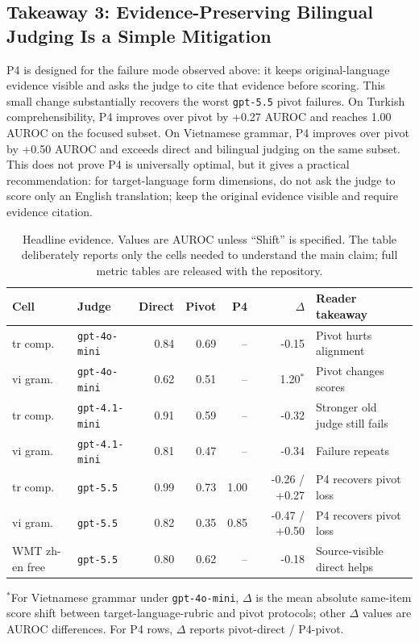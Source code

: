 \documentclass{article}
\begin{document}
\subsection{Takeaway 3: Evidence-Preserving Bilingual Judging Is a Simple Mitigation}

P4 is designed for the failure mode observed above: it keeps original-language evidence visible and asks the judge to cite that evidence before scoring. This small change substantially recovers the worst \texttt{gpt-5.5} pivot failures. On Turkish comprehensibility, P4 improves over pivot by +0.27 AUROC and reaches 1.00 AUROC on the focused subset. On Vietnamese grammar, P4 improves over pivot by +0.50 AUROC and exceeds direct and bilingual judging on the same subset. This does not prove P4 is universally optimal, but it gives a practical recommendation: for target-language form dimensions, do not ask the judge to score only an English translation; keep the original evidence visible and require evidence citation.

\begin{table}[t]
\centering
\caption{Headline evidence. Values are AUROC unless ``Shift'' is specified. The table deliberately reports only the cells needed to understand the main claim; full metric tables are released with the repository.}
\label{tab:headline_results}
\small
\setlength{\tabcolsep}{4pt}
\begin{tabular*}{\linewidth}{@{\extracolsep{\fill}}llrrrrl}
\toprule
Cell & Judge & Direct & Pivot & P4 & $\Delta$ & Reader takeaway \\
\midrule
tr comp. & \texttt{gpt-4o-mini} & 0.84 & 0.69 & -- & -0.15 & Pivot hurts alignment \\
vi gram. & \texttt{gpt-4o-mini} & 0.62 & 0.51 & -- & 1.20$^\ast$ & Pivot changes scores \\
tr comp. & \texttt{gpt-4.1-mini} & 0.91 & 0.59 & -- & -0.32 & Stronger old judge still fails \\
vi gram. & \texttt{gpt-4.1-mini} & 0.81 & 0.47 & -- & -0.34 & Failure repeats \\
tr comp. & \texttt{gpt-5.5} & 0.99 & 0.73 & 1.00 & -0.26 / +0.27 & P4 recovers pivot loss \\
vi gram. & \texttt{gpt-5.5} & 0.82 & 0.35 & 0.85 & -0.47 / +0.50 & P4 recovers pivot loss \\
WMT zh-en free & \texttt{gpt-5.5} & 0.80 & 0.62 & -- & -0.18 & Source-visible direct helps \\
\bottomrule
\end{tabular*}
\vspace{2pt}
\footnotesize $^\ast$For Vietnamese grammar under \texttt{gpt-4o-mini}, $\Delta$ is the mean absolute same-item score shift between target-language-rubric and pivot protocols; other $\Delta$ values are AUROC differences. For P4 rows, $\Delta$ reports pivot-direct / P4-pivot.
\end{table}
\end{document}
